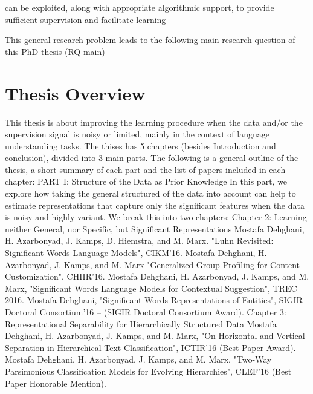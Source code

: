 can be exploited, along with appropriate algorithmic support, to provide sufficient supervision and facilitate learning

This general research problem leads to
the following main research question of this PhD thesis (RQ-main) 

\section{Thesis Overview}
This thesis is about improving the learning procedure when the data and/or the supervision signal is noisy or limited, mainly in the context of language understanding tasks. The thises has 5 chapters (besides Introduction and conclusion), divided into 3 main parts. The following is a general outline of the thesis, a short summary of each part and the list of papers included in each chapter: 
PART I: Structure of the Data as Prior Knowledge
In this part, we explore how taking the general structured of the data into account can help to estimate representations that capture only the significant features when the data is noisy and highly variant. We break this into two chapters:
Chapter 2: Learning neither General, nor Specific, but Significant Representations 
Mostafa Dehghani, H. Azarbonyad, J. Kamps, D. Hiemstra, and M. Marx. "Luhn Revisited: Significant Words Language Models", CIKM'16.
Mostafa Dehghani, H. Azarbonyad, J. Kamps, and M. Marx "Generalized Group Profiling for Content Customization", CHIIR'16.
Mostafa Dehghani, H. Azarbonyad, J. Kamps, and M. Marx, "Significant Words Language Models for Contextual Suggestion", TREC  2016.
Mostafa Dehghani, "Significant Words Representations of Entities", SIGIR-Doctoral Consortium'16 -- (SIGIR Doctoral Consortium Award).
Chapter 3:  Representational Separability for Hierarchically Structured Data
Mostafa Dehghani, H. Azarbonyad, J. Kamps, and M. Marx, "On Horizontal and Vertical Separation in Hierarchical Text Classification", ICTIR'16 (Best Paper Award).
Mostafa Dehghani, H. Azarbonyad, J. Kamps, and M. Marx, "Two-Way Parsimonious Classification Models for Evolving Hierarchies", CLEF'16 (Best Paper Honorable Mention).

